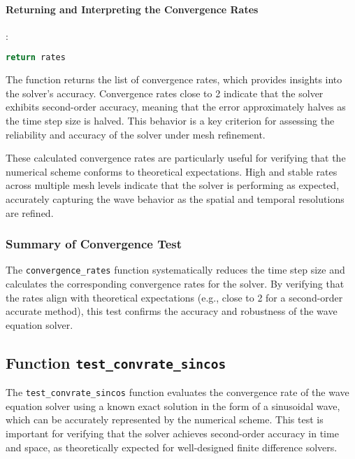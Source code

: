 \documentclass{article}
\begin{document}
			\paragraph{Returning and Interpreting the Convergence Rates}:
			
			\begin{lstlisting}[language=Python]
				return rates
			\end{lstlisting}
			
			The function returns the list of convergence rates, which provides insights into the solver’s accuracy. Convergence rates close to 2 indicate that the solver exhibits second-order accuracy, meaning that the error approximately halves as the time step size is halved. This behavior is a key criterion for assessing the reliability and accuracy of the solver under mesh refinement.
			
			These calculated convergence rates are particularly useful for verifying that the numerical scheme conforms to theoretical expectations. High and stable rates across multiple mesh levels indicate that the solver is performing as expected, accurately capturing the wave behavior as the spatial and temporal resolutions are refined.
			
				
			
			\subsubsection{Summary of Convergence Test}
			
			The \texttt{convergence\_rates} function systematically reduces the time step size and calculates the corresponding convergence rates for the solver. By verifying that the rates align with theoretical expectations (e.g., close to 2 for a second-order accurate method), this test confirms the accuracy and robustness of the wave equation solver.
	
		\subsection{Function \texttt{test\_convrate\_sincos}}
		
			The \texttt{test\_convrate\_sincos} function evaluates the convergence rate of the wave equation solver using a known exact solution in the form of a sinusoidal wave, which can be accurately represented by the numerical scheme. This test is important for verifying that the solver achieves second-order accuracy in time and space, as theoretically expected for well-designed finite difference solvers.
			
\end{document}

